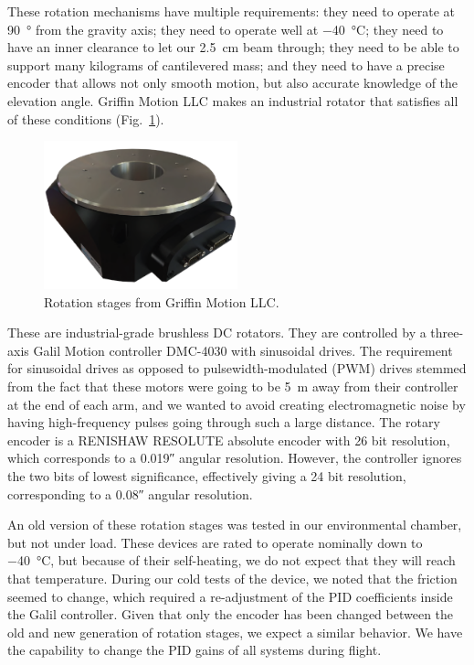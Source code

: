 These rotation mechanisms have multiple requirements: they need to operate at \SI{90}{\degree} from the gravity axis; they need to operate well at \SI{-40}{\celsius}; they need to have an inner clearance to let our \SI{2.5}{\cm} beam through; they need to be able to support many kilograms of cantilevered mass; and they need to have a precise encoder that allows not only smooth motion, but also accurate knowledge of the elevation angle. Griffin Motion LLC makes an industrial rotator that satisfies all of these conditions (Fig.~\ref{fig:GriffinRorationStatges}).

\begin{figure}[!h]
		\centering
		\includegraphics[width=0.5\textwidth]{Figures/Griffin.png} 
		\caption[Rotation stages]{Rotation stages from Griffin Motion LLC.}
		\label{fig:GriffinRorationStatges}
\end{figure}


These are industrial-grade brushless DC rotators. They are controlled by a three-axis Galil Motion controller DMC-4030 with sinusoidal drives. The requirement for sinusoidal drives as opposed to pulsewidth-modulated (PWM) drives stemmed from the fact that these motors were going to be \SI{5}{\meter} away from their controller at the end of each arm, and we wanted to avoid creating electromagnetic noise by having high-frequency pulses going through such a large distance. The rotary encoder is a RENISHAW RESOLUTE absolute encoder with 26 bit resolution, which corresponds to a \ang{;;0.019} angular resolution. However, the controller ignores the two bits of lowest significance, effectively giving a 24 bit resolution, corresponding to a \ang{;;0.08} angular resolution.

An old version of these rotation stages was tested in our environmental chamber, but not under load. These devices are rated to operate nominally down to \SI{-40}{\celsius}, but because of their self-heating, we do not expect that they will reach that temperature. During our cold tests of the device, we noted that the friction seemed to change, which required a re-adjustment of the PID coefficients inside the Galil controller. Given that only the encoder has been changed between the old and new generation of rotation stages, we expect a similar behavior. We have the capability to change the PID gains of all systems during flight.


